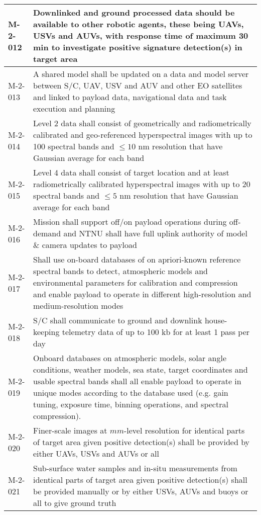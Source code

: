 \begin{table*}[htbp]
\begin{tabular}{l p{15cm}}
			\hline
			M-2-012  & Downlinked and ground processed data should be available to other robotic agents, these being UAVs, USVs and AUVs, with response time of maximum 30 min to investigate positive signature detection(s) in target area 
    \\ \hline
			M-2-013 & A shared model shall be updated on a data and model server between S/C, UAV, USV and AUV and other EO satellites and linked to payload data, navigational data and task execution and planning \\
			\hline
			M-2-014  & Level 2 data shall consist of geometrically and radiometrically calibrated and geo-referenced hyperspectral images with up to 100 spectral bands and $\leq10$ nm resolution that have Gaussian average for each band \\ 
			\hline	
			M-2-015  & Level 4 data shall consist of target location and at least radiometrically calibrated hyperspectral images with up to 20 spectral bands and $\leq5$ nm resolution that have Gaussian average for each band \\ 
		\hline	
			M-2-016  & Mission shall support off/on payload operations during off-demand and NTNU shall have full uplink authority of model \& camera updates to payload
    \\ \hline
			M-2-017  & Shall use on-board databases of on apriori-known reference spectral bands to detect, atmospheric models and environmental parameters for calibration and compression and enable payload to operate in different high-resolution and medium-resolution modes
    \\ \hline
		M-2-018  & S/C shall communicate to ground and downlink house-keeping telemetry data of up to 100 kb for at least 1 pass per day
    \\ \hline
		M-2-019  & Onboard databases on atmospheric models, solar angle conditions, weather models, sea state, target coordinates and usable spectral bands shall all enable payload to operate in unique modes according to the database used (e.g. gain tuning, exposure time, binning operations, and spectral compression). \\
		\hline
		M-2-020  & Finer-scale images at $mm$-level resolution for identical parts of target area given positive detection(s) shall be provided by either UAVs, USVs and AUVs or all \\ 
			\hline
		M-2-021  & Sub-surface water samples and in-situ measurements from identical parts of target area given positive detection(s) shall be provided manually or by either USVs, AUVs and buoys or all to give ground truth \\ 

\end{tabular}
\end{table*}
